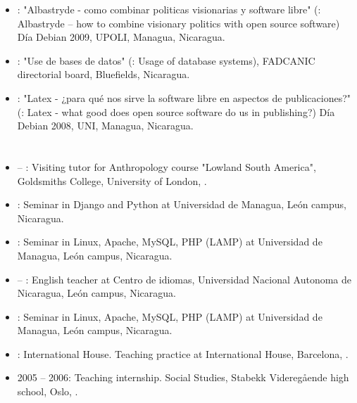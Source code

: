 \begin{itemize}
\item {}: "Albastryde - como combinar politicas visionarias y software libre" (\english: Albastryde – how to combine visionary politics with open source software) Día Debian 2009, UPOLI, Managua, Nicaragua.

\item {}: "Use de bases de datos" (\english: Usage of database systems), FADCANIC directorial board, Bluefields, Nicaragua.

\item {}: "Latex - ¿para qué nos sirve la software libre en aspectos de publicaciones?" (\english: Latex - what good does open source software do us in publishing?) Día Debian 2008, UNI, Managua, Nicaragua.
\end{itemize}


\section*{\teachingexperience}

\begin{itemize}
\item {} – : Visiting tutor for Anthropology course "Lowland South America", Goldsmiths College, University of London, \UK.

\item {}: Seminar in Django and Python at Universidad de Managua, León campus, Nicaragua.

\item {}: Seminar in Linux, Apache, MySQL, PHP (LAMP) at Universidad de Managua, León campus, Nicaragua.

\item {} – : English teacher at Centro de idiomas, Universidad Nacional Autonoma de Nicaragua, León campus, Nicaragua.

\item {}: Seminar in Linux, Apache, MySQL, PHP (LAMP) at Universidad de Managua, León campus, Nicaragua.

\item {}: International House. Teaching practice at International House, Barcelona, \Spain.

\item 2005 – 2006: Teaching internship. \english \und Social Studies, Stabekk Videregående high school, Oslo, \Norway.

\end{itemize}
